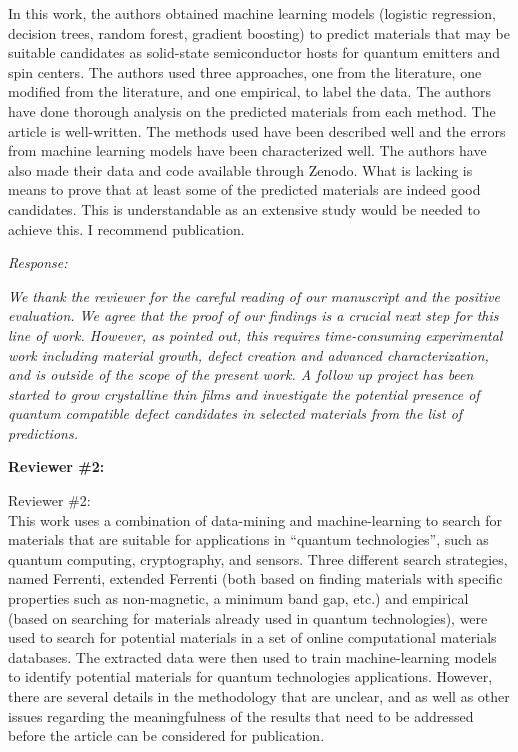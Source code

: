 \documentclass[11pt, a4paper]{letter} %
\begin{document}
In this work, the authors obtained machine learning models (logistic regression, decision trees, random forest, gradient boosting) to predict materials that may be suitable candidates as solid-state semiconductor hosts for quantum emitters and spin centers. The authors used three approaches, one from the literature, one modified from the literature, and one empirical, to label the data. The authors have done thorough analysis on the predicted materials from each method. The article is well-written. The methods used have been described well and the errors from machine learning models have been characterized well. The authors have also made their data and code available through Zenodo. What is lacking is means to prove that at least some of the predicted materials are indeed good candidates. This is understandable as an extensive study would be needed to achieve this. I recommend publication.  

\textit{Response: }  

\textit{We thank the reviewer for the careful reading of our manuscript and the positive evaluation. We agree that the proof of our findings is a crucial next step for this line of work. However, as pointed out, this requires time-consuming experimental work including material growth, defect creation and advanced characterization, and is outside of the scope of the present work. A follow up project has been started to grow crystalline thin films and investigate the potential presence of quantum compatible defect candidates in selected materials from the list of predictions. }

\noindent
\textbf{Reviewer \#2: }

Reviewer \#2: \\
This work uses a combination of data-mining and machine-learning to search for materials that are suitable for applications in “quantum technologies”, such as quantum computing, cryptography, and sensors. Three different search strategies, named Ferrenti, extended Ferrenti (both based on finding materials with specific properties such as non-magnetic, a minimum band gap, etc.) and empirical (based on searching for materials already used in quantum technologies), were used to search for potential materials in a set of online computational materials databases. The extracted data were then used to train machine-learning models to identify potential materials for quantum technologies applications. However, there are several details in the methodology that are unclear, and as well as other issues regarding the meaningfulness of the results that need to be addressed before the article can be considered for publication.
\end{document}
